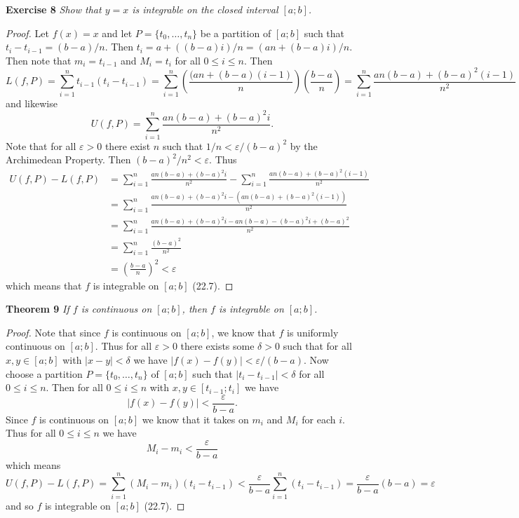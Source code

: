 \documentclass{article}
\begin{document}
\begin{flushleft}
\textbf{Exercise 8}
\textsl{Show that $y=x$ is integrable on the closed interval $[a;b]$.}
\begin{proof}
Let $f (x) = x$ and let $P = \{t_0, \dots , t_n\}$ be a partition of $[a;b]$ such that $t_i - t_{i-1} = (b-a)/n$. Then $t_i = a + ((b-a)i)/n = (an + (b-a)i)/n$. Then note that $m_i = t_{i-1}$ and $M_i = t_i$ for all $0 \leq i \leq n$. Then
\[
L(f,P) = \sum_{i=1}^n t_{i-1} (t_i-t_{i-1}) = \sum_{i=1}^n \left ( \frac{(an + (b-a)(i-1)}{n} \right ) \left ( \frac{b-a}{n} \right ) = \sum_{i=1}^n \frac{an(b-a) + (b-a)^2 (i-1)}{n^2}
\]
and likewise
\[
U(f,P) = \sum_{i=1}^n \frac{an(b-a) + (b-a)^2 i}{n^2}.
\]
Note that for all $\varepsilon > 0$ there exist $n$ such that $1/n < \varepsilon/(b-a)^2$ by the Archimedean Property. Then $(b-a)^2/n^2 < \varepsilon$. Thus
\begin{align*}
U(f,P) - L(f,P) &= \sum_{i=1}^n \frac{an(b-a) + (b-a)^2 i}{n^2} - \sum_{i=1}^n \frac{an(b-a) + (b-a)^2 (i-1)}{n^2} \\
	&= \sum_{i=1}^n \frac{an(b-a) + (b-a)^2 i - (an(b-a) + (b-a)^2 (i-1))}{n^2} \\
	&= \sum_{i=1}^n \frac{an(b-a) + (b-a)^2 i - an(b-a) - (b-a)^2 i + (b-a)^2}{n^2} \\
	&= \sum_{i=1}^n \frac{(b-a)^2}{n^2} \\
	&= \left ( \frac{b-a}{n} \right )^2 < \varepsilon
\end{align*}
which means that $f$ is integrable on $[a;b]$ (22.7).
\end{proof}

\textbf{Theorem 9}
\textsl{If $f$ is continuous on $[a;b]$, then $f$ is integrable on $[a;b]$.}
\begin{proof}
Note that since $f$ is continuous on $[a;b]$, we know that $f$ is uniformly continuous on $[a;b]$. Thus for all $\varepsilon > 0$ there exists some $\delta > 0$ such that for all $x,y \in [a;b]$ with $|x-y| < \delta$ we have $|f(x) - f(y)| < \varepsilon/(b-a)$. Now choose a partition $P = \{t_0, \dots , t_n\}$ of $[a;b]$ such that $|t_i-t_{i-1}| < \delta$ for all $0 \leq i \leq n$. Then for all $0 \leq i \leq n$ with $x,y \in [t_{i-1};t_i]$ we have
\[
|f(x)-f(y)| < \frac{\varepsilon}{b-a}.
\]
Since $f$ is continuous on $[a;b]$ we know that it takes on $m_i$ and $M_i$ for each $i$. Thus for all $0 \leq i \leq n$ we have
\[
M_i - m_i < \frac{\varepsilon}{b-a}
\]
which means
\[
U(f,P) - L(f,P) = \sum_{i=1}^n (M_i-m_i) (t_i-t_{i-1}) < \frac{\varepsilon}{b-a} \sum_{i=1}^n (t_i-t_{i-1}) = \frac{\varepsilon}{b-a}(b-a) = \varepsilon
\]
and so $f$ is integrable on $[a;b]$ (22.7).
\end{proof}


\end{flushleft}
\end{document}
